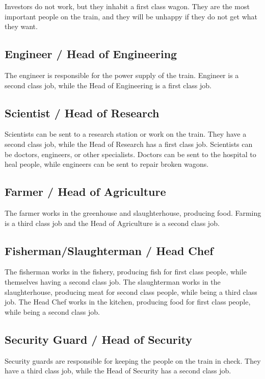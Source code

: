Investors do not work, but they inhabit a first class wagon.
They are the most important people on the train, and they will be unhappy if they do not get what they want.

\subsection{Engineer / Head of Engineering}

The engineer is responsible for the power supply of the train.
Engineer is a second class job, while the Head of Engineering is a first class job.

\subsection{Scientist / Head of Research}

Scientists can be sent to a research station or work on the train.
They have a second class job, while the Head of Research has a first class job.
Scientists can be doctors, engineers, or other specialists.
Doctors can be sent to the hospital to heal people, while engineers can be sent to repair broken wagons.

\subsection{Farmer / Head of Agriculture}

The farmer works in the greenhouse and slaughterhouse, producing food.
Farming is a third class job and the Head of Agriculture is a second class job.

\subsection{Fisherman/Slaughterman / Head Chef}

The fisherman works in the fishery, producing fish for first class people, while themselves having a second class job.
The slaughterman works in the slaughterhouse, producing meat for second class people, while being a third class job.
The Head Chef works in the kitchen, producing food for first class people, while being a second class job.

\subsection{Security Guard / Head of Security}

Security guards are responsible for keeping the people on the train in check.
They have a third class job, while the Head of Security has a second class job.

